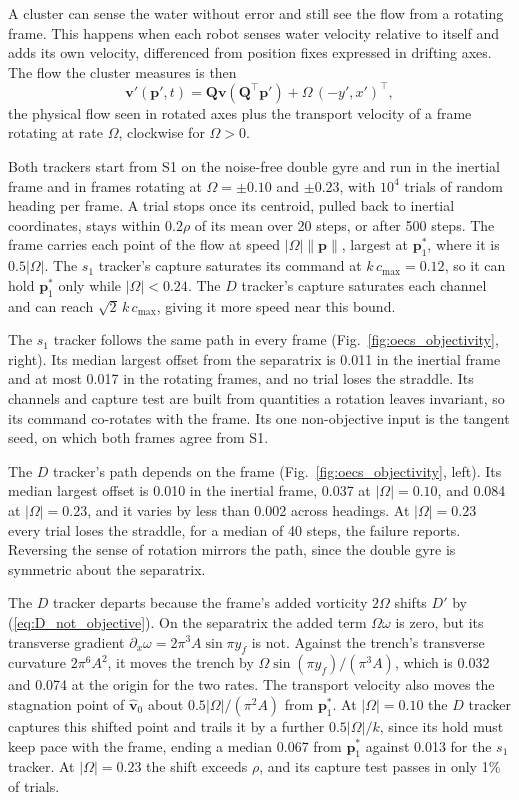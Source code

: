 \documentclass[lettersize,journal]{IEEEtran}
\begin{document}
A cluster can sense the water without error and still see the flow from a
rotating frame. This happens when each robot senses water velocity relative
to itself and adds its own velocity, differenced from position fixes
expressed in drifting axes. The flow the cluster measures is then
\[
\mathbf{v}'(\mathbf{p}', t) =
\mathbf{Q}\mathbf{v}(\mathbf{Q}^\top \mathbf{p}') + \Omega\,(-y', x')^\top ,
\]
the physical flow seen in rotated axes plus the transport velocity of a
frame rotating at rate $\Omega$, clockwise for $\Omega > 0$.

Both trackers start from S1 on the noise-free double gyre and run in the
inertial frame and in frames rotating at $\Omega = \pm 0.10$ and
$\pm 0.23$, with $10^4$ trials of random heading per frame. A trial stops
once its centroid, pulled back to inertial coordinates, stays within
$0.2\rho$ of its mean over 20 steps, or after 500 steps. The frame carries each point of the flow at speed
$|\Omega|\lVert\mathbf{p}\rVert$, largest at $\mathbf{p}^*_1$, where it
is $0.5|\Omega|$. The $s_1$ tracker's capture saturates its command at
$k\,c_{\max} = 0.12$, so it can hold $\mathbf{p}^*_1$ only while
$|\Omega| < 0.24$. The $D$ tracker's capture saturates each channel and
can reach $\sqrt{2}\,k\,c_{\max}$, giving it more speed near this bound.

The $s_1$ tracker follows the same path in every frame
(Fig.~\ref{fig:oecs_objectivity}, right). Its median largest offset from
the separatrix is 0.011 in the inertial frame and at most
0.017 in the rotating frames, and no trial loses the straddle. Its
channels and capture test are built from quantities a rotation leaves
invariant, so its command co-rotates with the frame. Its one
non-objective input is the tangent seed, on which both frames agree from
S1.

The $D$ tracker's path depends on the frame
(Fig.~\ref{fig:oecs_objectivity}, left). Its median largest offset is
0.010 in the inertial frame, 0.037 at $|\Omega| = 0.10$, and
0.084 at $|\Omega| = 0.23$, and it varies by less than 0.002
across headings. At $|\Omega| = 0.23$ every trial loses the straddle, for
a median of 40 steps, the failure \cite{26} reports. Reversing the
sense of rotation mirrors the path, since the double gyre is symmetric
about the separatrix.

The $D$ tracker departs because the frame's added vorticity $2\Omega$
shifts $D'$ by (\ref{eq:D_not_objective}). On the separatrix the added
term $\Omega\omega$ is zero, but its transverse gradient
$\partial_x\omega = 2\pi^3 A\sin\pi y_f$ is not. Against the trench's
transverse curvature $2\pi^6 A^2$, it moves the trench by
$\Omega\sin(\pi y_f)/(\pi^3 A)$, which is 0.032 and 0.074 at the
origin for the two rates. The transport velocity also moves the
stagnation point of $\hat{\mathbf{v}}_0$ about $0.5|\Omega|/(\pi^2 A)$
from $\mathbf{p}^*_1$. At $|\Omega| = 0.10$ the $D$ tracker captures this
shifted point and trails it by a further $0.5|\Omega|/k$, since its hold
must keep pace with the frame, ending a median 0.067 from
$\mathbf{p}^*_1$ against 0.013 for the $s_1$ tracker. At $|\Omega| = 0.23$ the
shift exceeds $\rho$, and its capture test passes in only 1\% of
trials.
\end{document}
